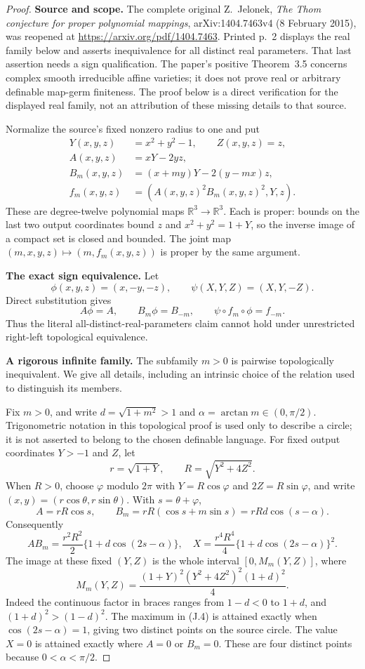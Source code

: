 \begin{proof}

\textbf{Source and scope.}\quad
The complete original Z.~Jelonek, \emph{The Thom conjecture for proper
polynomial mappings}, arXiv:1404.7463v4 (8 February 2015), was reopened
at \url{https://arxiv.org/pdf/1404.7463}. Printed p.~2 displays the real
family below and asserts inequivalence for all distinct real parameters.
That last assertion needs a sign qualification. The paper's positive
Theorem~3.5 concerns complex smooth irreducible affine varieties;
it does not prove real or arbitrary definable map-germ finiteness.
The proof below is a direct verification for the displayed real family,
not an attribution of these missing details to that source.

Normalize the source's fixed nonzero radius to one and put
\[
\begin{split}
 Y(x,y,z)&=x^2+y^2-1,\qquad Z(x,y,z)=z,\\
 A(x,y,z)&=xY-2yz,\\
 B_m(x,y,z)&=(x+my)Y-2(y-mx)z,\\
 f_m(x,y,z)&=(A(x,y,z)^2B_m(x,y,z)^2,Y,z).
\end{split}
\tag{J.1}
\]
These are degree-twelve polynomial maps $\mathbb R^3\to\mathbb R^3$.
Each is proper: bounds on the last two output coordinates bound $z$
and $x^2+y^2=1+Y$, so the inverse image of a compact set is closed and
bounded. The joint map $(m,x,y,z)\mapsto(m,f_m(x,y,z))$ is proper by
the same argument.

\textbf{The exact sign equivalence.}\quad
Let
\[
 \phi(x,y,z)=(x,-y,-z),\qquad
 \psi(X,Y,Z)=(X,Y,-Z).
\]
Direct substitution gives
\[
 A\phi=A,\qquad B_m\phi=B_{-m},\qquad
 \psi\circ f_m\circ\phi=f_{-m}.
\tag{J.2}
\]
Thus the literal all-distinct-real-parameters claim cannot hold under
unrestricted right-left topological equivalence.

\textbf{A rigorous infinite family.}\quad
The subfamily $m>0$ is pairwise topologically inequivalent. We give
all details, including an intrinsic choice of the relation used to
distinguish its members.

Fix $m>0$, and write $d=\sqrt{1+m^2}>1$ and
$\alpha=\arctan m\in(0,\pi/2)$. Trigonometric notation in this
topological proof is used only to describe a circle; it is not asserted
to belong to the chosen definable language. For fixed output coordinates
$Y>-1$ and $Z$, let
\[
 r=\sqrt{1+Y},\qquad R=\sqrt{Y^2+4Z^2}.
\]
When $R>0$, choose $\varphi$ modulo $2\pi$ with
$Y=R\cos\varphi$ and $2Z=R\sin\varphi$, and write
$(x,y)=(r\cos\theta,r\sin\theta)$. With $s=\theta+\varphi$,
\[
 A=rR\cos s,\qquad
 B_m=rR(\cos s+m\sin s)=rRd\cos(s-\alpha).
\]
Consequently
\[
 A B_m=\frac{r^2R^2}{2}\{1+d\cos(2s-\alpha)\},
\quad
 X=\frac{r^4R^4}{4}\{1+d\cos(2s-\alpha)\}^2.
\tag{J.3}
\]
The image at these fixed $(Y,Z)$ is the whole interval $[0,M_m(Y,Z)]$,
where
\[
 M_m(Y,Z)=\frac{(1+Y)^2(Y^2+4Z^2)^2(1+d)^2}{4}.
\tag{J.4}
\]
Indeed the continuous factor in braces ranges from $1-d<0$ to
$1+d$, and $(1+d)^2>(1-d)^2$. The maximum in (J.4) is attained
exactly when $\cos(2s-\alpha)=1$, giving two distinct points on the
source circle. The value $X=0$ is attained exactly where $A=0$ or
$B_m=0$. These are four distinct points because
$0<\alpha<\pi/2$.


\end{proof}
